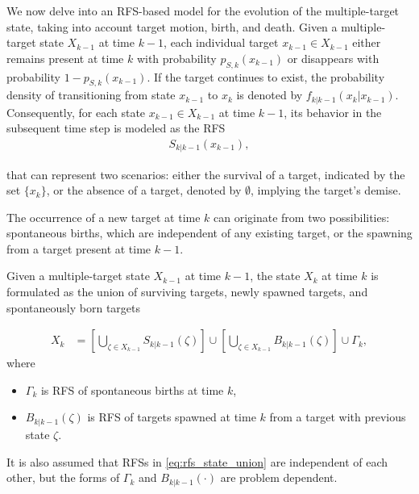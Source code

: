 We now delve into an RFS-based model for the evolution of the multiple-target state, taking into account target motion,
birth, and death. Given a multiple-target state $X_{k-1}$ at time $k-1$, each individual target $x_{k-1} \in X_{k-1}$ either remains present at time $k$ with probability $p_{S,k}(x_{k-1})$ or disappears with probability $1 - p_{S,k}(x_{k-1})$. If the target continues to exist, the probability density of transitioning from state $x_{k-1}$ to $x_k$ is denoted by $f_{k|k-1}(x_k|x_{k-1})$. Consequently, for each state $x_{k-1} \in X_{k-1}$ at time $k-1$, its behavior in the subsequent time step is modeled as the RFS
\begin{align}
    S_{k|k-1}(x_{k-1}),
\end{align}

that can represent two scenarios: either the survival of a target, indicated by the set $\{x_k\}$, or the absence of a
target, denoted by $\emptyset$, implying the target's demise.

The occurrence of a new target at time $k$ can originate from two possibilities: spontaneous births, which are independent of any existing target, or the spawning from a target present at time $k-1$.

Given a multiple-target state $X_{k-1}$ at time $k-1$, the state $X_k$ at time $k$ is formulated as the union of
surviving targets, newly spawned targets, and spontaneously born targets

\begin{align}
    X_k &= \left[\bigcup_{\zeta \in X_{k-1}}S_{k|k-1}(\zeta) \right] \cup \left[ \bigcup_{\zeta \in X_{k-1}} B_{k|k-1}(\zeta) \right] \cup \Gamma_k, \label{eq:rfs_state_union}
\end{align}
where
\begin{itemize}
    \item $\Gamma_k$ is RFS of spontaneous births at time $k$,
    \item $B_{k|k-1}(\zeta)$ is RFS of targets spawned at time $k$ from a target with previous state $\zeta$.
\end{itemize}
It is also assumed that RFSs in \ref{eq:rfs_state_union} are independent of each other, but the forms of $\Gamma_k$
and $B_{k|k-1}(\cdot)$ are problem dependent.

